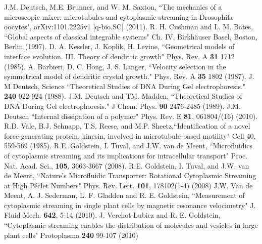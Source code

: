 \documentclass[11pt]{ucthesis}
\begin{document}
\begin{thebibliography}{}
 J.M. Deutsch, M.E. Brunner, and W. M. Saxton,
``The mechanics of a microscopic mixer: microtubules and cytoplasmic streaming in Drosophila oocytes", arXiv:1101.2225v1 [q-bio.SC] (2011).
 R. H. Cushman and L. M. Bates, ``Global aspects of classical integrable systems" Ch. IV, Birkh\"auser Basel, Boston, Berlin (1997).
 D. A. Kessler, J. Koplik, H. Levine, ``Geometrical models of interface evolution. III. Theory of dendritic growth"  Phys. Rev. A {\bf 31}  1712 (1985).
 A. Barbieri, D. C. Hong, J. S. Langer, ``Velocity selection in the symmetrical model of dendritic crystal growth." 
Phys. Rev. A {\bf 35} 1802 (1987).
 J. M Deutsch, Science ``Theoretical Studies of DNA During Gel electrophoresis." {\bf 240} 922-924 (1988).   
  J.M. Deutsch and TM. Madden,  ``Theoretical Studies of DNA During Gel electrophoresis." J Chem. Phys. {\bf 90} 2476-2485 (1989).
 J.M. Deutsch ``Internal dissipation of a polymer" Phys. Rev. E {\bf 81}, 061804/(16) (2010).
 R.D. Vale, B.J.  Schnapp, T.S. Reese, and M.P.  Sheetz,``Identification of a novel force-generating protein, kinesin, involved in microtubule-based motility"   Cell 40, 559-569 (1985).
 R.E. Goldstein, I. Tuval, and J.W. van de Meent, ``Microfluidics of cytoplasmic streaming and its
implications for intracellular transport" Proc. Nat. Acad. Sci.,  {\bf 105}, 3663-3667 (2008).
 R.E. Goldstein, I. Tuval, and J.W. van de Meent, 
``Nature’s Microfluidic Transporter: Rotational Cytoplasmic Streaming at High P{\'e}clet Numbers"
Phys. Rev. Lett. {\bf 101}, 178102(1-4) (2008)
 J.W. Van de Meent, A. J. Sederman, L. F. Gladden and R. E. Goldstein,
``Measurement of cytoplasmic streaming in single plant cells by magnetic resonance velocimetry"
J. Fluid Mech. {\bf 642},  5-14 (2010).
J. Verchot-Lubicz  and R. E. Goldstein, ``Cytoplasmic streaming enables the distribution of molecules
and vesicles in large plant cells" Protoplasma {\bf 240} 99-107 (2010) 

\end{thebibliography}
\end{document}
